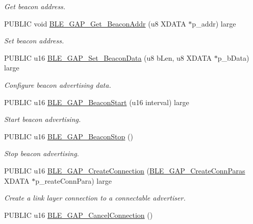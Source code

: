 \begin{DoxyCompactItemize}
\begin{DoxyCompactList}\small\item\em Get beacon address. \end{DoxyCompactList}\item 
P\+U\+B\+L\+IC void \hyperlink{group___b_l_e___g_a_p_gaf551ec68400e16632d0a2cf3ee78991a}{B\+L\+E\+\_\+\+G\+A\+P\+\_\+\+Get\+\_\+\+Beacon\+Addr} (u8 X\+D\+A\+TA $\ast$p\+\_\+addr) large
\begin{DoxyCompactList}\small\item\em Set beacon address. \end{DoxyCompactList}\item 
P\+U\+B\+L\+IC u16 \hyperlink{group___b_l_e___g_a_p_ga3e55d691146c4998ef89bcd4c7b2a560}{B\+L\+E\+\_\+\+G\+A\+P\+\_\+\+Set\+\_\+\+Beacon\+Data} (u8 b\+Len, u8 X\+D\+A\+TA $\ast$p\+\_\+b\+Data) large
\begin{DoxyCompactList}\small\item\em Configure beacon advertising data. \end{DoxyCompactList}\item 
P\+U\+B\+L\+IC u16 \hyperlink{group___b_l_e___g_a_p_ga001f164e674f3a808986b564b15a3932}{B\+L\+E\+\_\+\+G\+A\+P\+\_\+\+Beacon\+Start} (u16 interval) large
\begin{DoxyCompactList}\small\item\em Start beacon advertising. \end{DoxyCompactList}\item 
P\+U\+B\+L\+IC u16 \hyperlink{group___b_l_e___g_a_p_ga2fba232287811bea72e436c58655835d}{B\+L\+E\+\_\+\+G\+A\+P\+\_\+\+Beacon\+Stop} ()
\begin{DoxyCompactList}\small\item\em Stop beacon advertising. \end{DoxyCompactList}\item 
P\+U\+B\+L\+IC u16 \hyperlink{group___b_l_e___g_a_p_ga35345a91fc03018e96c379315b583f4d}{B\+L\+E\+\_\+\+G\+A\+P\+\_\+\+Create\+Connection} (\hyperlink{struct_b_l_e___g_a_p___create_conn_paras}{B\+L\+E\+\_\+\+G\+A\+P\+\_\+\+Create\+Conn\+Paras} X\+D\+A\+TA $\ast$p\+\_\+reate\+Conn\+Para) large
\begin{DoxyCompactList}\small\item\em Create a link layer connection to a connectable advertiser. \end{DoxyCompactList}\item 
P\+U\+B\+L\+IC u16 \hyperlink{group___b_l_e___g_a_p_ga7a7b5e2dc4bf3138a4b17f57c34efdd0}{B\+L\+E\+\_\+\+G\+A\+P\+\_\+\+Cancel\+Connection} ()

\end{DoxyCompactItemize}
